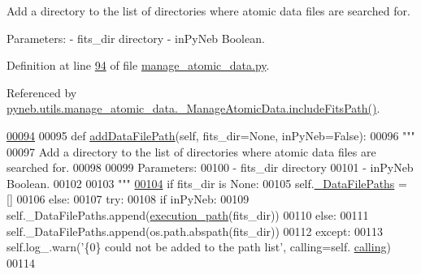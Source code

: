 \begin{DoxyVerb}Add a directory to the list of directories where atomic data files are searched for.

Parameters:
   - fits_dir    directory
   - inPyNeb     Boolean.\end{DoxyVerb}
 

Definition at line \hyperlink{manage__atomic__data_8py_source_l00094}{94} of file \hyperlink{manage__atomic__data_8py_source}{manage\-\_\-atomic\-\_\-data.\-py}.



Referenced by \hyperlink{manage__atomic__data_8py_source_l00028}{pyneb.\-utils.\-manage\-\_\-atomic\-\_\-data.\-\_\-\-Manage\-Atomic\-Data.\-include\-Fits\-Path()}.


\begin{DoxyCode}
\hypertarget{classpyneb_1_1utils_1_1manage__atomic__data_1_1___manage_atomic_data_l00094}{}\hyperlink{classpyneb_1_1utils_1_1manage__atomic__data_1_1___manage_atomic_data_a9c22482034e5d9154e315649c079b8fd}{00094} 
00095     \textcolor{keyword}{def }\hyperlink{classpyneb_1_1utils_1_1manage__atomic__data_1_1___manage_atomic_data_a9c22482034e5d9154e315649c079b8fd}{addDataFilePath}(self, fits\_dir=None, inPyNeb=False):
00096         \textcolor{stringliteral}{"""}
00097 \textcolor{stringliteral}{        Add a directory to the list of directories where atomic data files are searched for.}
00098 \textcolor{stringliteral}{        }
00099 \textcolor{stringliteral}{        Parameters:}
00100 \textcolor{stringliteral}{           - fits\_dir    directory}
00101 \textcolor{stringliteral}{           - inPyNeb     Boolean.}
00102 \textcolor{stringliteral}{}
00103 \textcolor{stringliteral}{        """}
\hypertarget{classpyneb_1_1utils_1_1manage__atomic__data_1_1___manage_atomic_data_l00104}{}\hyperlink{classpyneb_1_1utils_1_1manage__atomic__data_1_1___manage_atomic_data_a92da10ed6b2395c54f88300c05a71ae9}{00104}         \textcolor{keywordflow}{if} fits\_dir \textcolor{keywordflow}{is} \textcolor{keywordtype}{None}:
00105             self.\hyperlink{classpyneb_1_1utils_1_1manage__atomic__data_1_1___manage_atomic_data_a92da10ed6b2395c54f88300c05a71ae9}{\_DataFilePaths} = []
00106         \textcolor{keywordflow}{else}:
00107             \textcolor{keywordflow}{try}:
00108                 \textcolor{keywordflow}{if} inPyNeb:
00109                     self.\_DataFilePaths.append(\hyperlink{namespacepyneb_1_1utils_1_1misc_a937fc19e910346d9d288992e8eeab0ea}{execution\_path}(fits\_dir))
00110                 \textcolor{keywordflow}{else}:
00111                     self.\_DataFilePaths.append(os.path.abspath(fits\_dir))
00112             \textcolor{keywordflow}{except}:
00113                 self.log\_.warn(\textcolor{stringliteral}{'\{0\} could not be added to the path list'}, calling=self.
      \hyperlink{classpyneb_1_1utils_1_1manage__atomic__data_1_1___manage_atomic_data_ab10b91ca784741ce7af163d010802434}{calling})
00114  
 
\end{DoxyCode}
